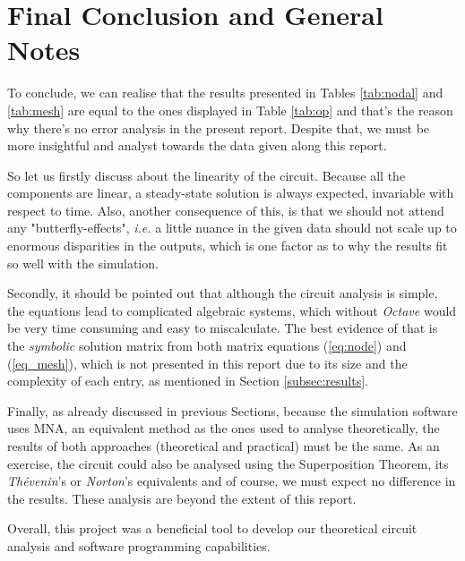 \section{Final Conclusion and General Notes}
\label{sec:conclusion}

To conclude, we can realise that the results presented in Tables \ref{tab:nodal} and \ref{tab:mesh} are equal to the ones displayed in Table \ref{tab:op} and that's the reason why there's no error analysis in the present report.  Despite that, we must be more insightful and analyst towards the data given along this report. \par
So let us firstly discuss about the linearity of the circuit. Because all the components are linear, a steady-state solution is always expected, invariable with respect to time. Also, another consequence of this, is that we should not attend any "butterfly-effects", \textit{i.e.} a little nuance in the given data should not scale up to enormous disparities in the outputs, which is one factor as to why the results fit so well with the simulation. \par
Secondly, it should be pointed out that although the circuit analysis is simple, the equations lead to complicated algebraic systems, which without \textit{Octave} would be very time consuming and easy to miscalculate. The best evidence of that is the \emph{symbolic} solution matrix from both matrix equations (\ref{eq:node}) and (\ref{eq_mesh}), which is not presented in this report due to its size and the complexity of each entry, as mentioned in Section \ref{subsec:results}. \par
Finally, as already discussed in previous Sections, because the simulation software uses MNA, an equivalent method as the ones used to analyse theoretically, the results of both approaches (theoretical and practical) must be the same. As an exercise, the circuit could also be analysed using the Superposition Theorem, its \textit{Thévenin}'s or \textit{Norton}'s equivalents and of course, we must expect no difference in the results. These analysis are beyond the extent of this report. 

Overall, this project was a beneficial tool to develop our theoretical circuit analysis and software programming capabilities. 

